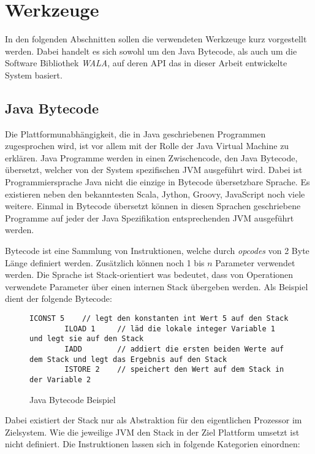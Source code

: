 \chapter{Werkzeuge}

In den folgenden Abschnitten sollen die verwendeten Werkzeuge kurz vorgestellt werden. Dabei handelt es 
sich sowohl um den Java Bytecode, als auch um die Software Bibliothek \textit{WALA}, auf deren API das 
in dieser Arbeit entwickelte System basiert. 

\section{Java Bytecode}

Die Plattformunabhängigkeit, die in Java geschriebenen Programmen zugesprochen wird, 
ist vor allem mit der Rolle der Java Virtual Machine zu erklären. Java Programme werden 
in einen Zwischencode, den Java Bytecode, übersetzt, welcher von der System spezifischen 
JVM ausgeführt wird. Dabei ist Programmiersprache Java nicht die einzige in Bytecode 
übersetzbare Sprache. Es existieren neben den bekanntesten Scala, Jython, Groovy,
JavaScript noch viele weitere. Einmal in Bytecode übersetzt können in diesen Sprachen 
geschriebene Programme auf jeder der Java Spezifikation entsprechenden JVM ausgeführt 
werden. 

Bytecode ist eine Sammlung von Instruktionen, welche durch \textit{opcodes} von 2 Byte Länge definiert 
werden. Zusätzlich können noch 1 bis $n$ Parameter verwendet werden. Die Sprache ist Stack-orientiert was 
bedeutet, dass von Operationen verwendete Parameter über einen internen Stack übergeben werden. Als Beispiel 
dient der folgende Bytecode:

\begin{figure}[H]
	\begin{lstlisting}[language=Bytecode]
		ICONST 5 	// legt den konstanten int Wert 5 auf den Stack 
		ILOAD 1		// läd die lokale integer Variable 1 und legt sie auf den Stack
		IADD 		// addiert die ersten beiden Werte auf dem Stack und legt das Ergebnis auf den Stack
		ISTORE 2	// speichert den Wert auf dem Stack in der Variable 2
	\end{lstlisting} 
	\caption{Java Bytecode Beispiel}
\end{figure}

Dabei existiert der Stack nur als Abstraktion für den eigentlichen Prozessor im Zielsystem. Wie die 
jeweilige JVM den Stack in der Ziel Plattform umsetzt ist nicht definiert. Die Instruktionen lassen sich in 
folgende Kategorien einordnen:


